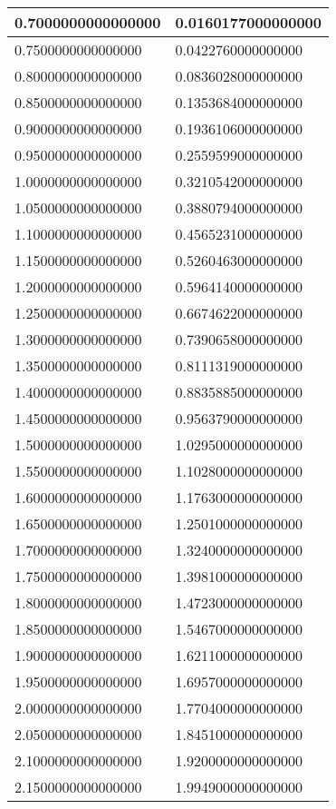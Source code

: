 \documentclass[a4paper,14pt]{article}
\begin{document}
\begin{longtable}{|l|l|}
0.7000000000000000	&	0.0160177000000000\\ \hline
0.7500000000000000	&	0.0422760000000000\\ \hline
0.8000000000000000	&	0.0836028000000000\\ \hline
0.8500000000000000	&	0.1353684000000000\\ \hline
0.9000000000000000	&	0.1936106000000000\\ \hline
0.9500000000000000	&	0.2559599000000000\\ \hline
1.0000000000000000	&	0.3210542000000000\\ \hline
1.0500000000000000	&	0.3880794000000000\\ \hline
1.1000000000000000	&	0.4565231000000000\\ \hline
1.1500000000000000	&	0.5260463000000000\\ \hline
1.2000000000000000	&	0.5964140000000000\\ \hline
1.2500000000000000	&	0.6674622000000000\\ \hline
1.3000000000000000	&	0.7390658000000000\\ \hline
1.3500000000000000	&	0.8111319000000000\\ \hline
1.4000000000000000	&	0.8835885000000000\\ \hline
1.4500000000000000	&	0.9563790000000000\\ \hline
1.5000000000000000	&	1.0295000000000000\\ \hline
1.5500000000000000	&	1.1028000000000000\\ \hline
1.6000000000000000	&	1.1763000000000000\\ \hline
1.6500000000000000	&	1.2501000000000000\\ \hline
1.7000000000000000	&	1.3240000000000000\\ \hline
1.7500000000000000	&	1.3981000000000000\\ \hline
1.8000000000000000	&	1.4723000000000000\\ \hline
1.8500000000000000	&	1.5467000000000000\\ \hline
1.9000000000000000	&	1.6211000000000000\\ \hline
1.9500000000000000	&	1.6957000000000000\\ \hline
2.0000000000000000	&	1.7704000000000000\\ \hline
2.0500000000000000	&	1.8451000000000000\\ \hline
2.1000000000000000	&	1.9200000000000000\\ \hline
2.1500000000000000	&	1.9949000000000000\\ \hline

\end{longtable}
\end{document}
